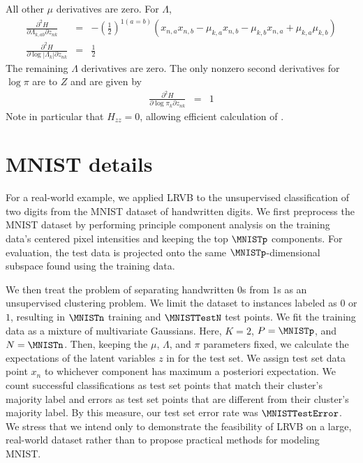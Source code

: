 %
All other $\mu$ derivatives are zero. For $\Lambda$,
%
\begin{eqnarray*}
\frac{\partial^{2}H}{\partial\Lambda_{k,ab}\partial z_{nk}} & = & -\left(\frac{1}{2}\right)^{1(a=b)}\left(x_{n,a}x_{n,b}-\mu_{k,a}x_{n,b}-\mu_{k,b}x_{n,a}+\mu_{k,a}\mu_{k,b}\right)\\
\frac{\partial^{2}H}{\partial\log\left|\Lambda_{k}\right|\partial z_{nk}} & = & \frac{1}{2}
\end{eqnarray*}
%
The remaining $\Lambda$ derivatives are zero. The only nonzero second
derivatives for $\log\pi$ are to $Z$ and are given by
%
\begin{eqnarray*}
\frac{\partial^{2}H}{\partial\log\pi_{k}\partial z_{nk}} & = & 1
\end{eqnarray*}
%
Note in particular that $H_{zz} = 0$, allowing efficient calculation of
.

\section{MNIST details} \label{app:mnist_details}

For a real-world example,
we applied LRVB to the unsupervised classification of two digits
from the MNIST dataset of handwritten digits.
We first preprocess the MNIST dataset by performing principle component
analysis on the training data's centered pixel intensities
and keeping the top $\MNISTp$ components.
For evaluation, the test data is projected onto the same
$\MNISTp$-dimensional subspace found using the training data.

We then treat the problem of
separating handwritten $0$s from $1$s as an unsupervised clustering
problem.  We limit the dataset to instances labeled as $0$
or $1$, resulting in $\MNISTn$ training and $\MNISTTestN$ test points.
We fit the training data
as a mixture of multivariate Gaussians.  Here, $K=2$, $P=\MNISTp$, and
$N=\MNISTn$.  Then, keeping the $\mu$, $\Lambda$, and $\pi$
parameters fixed, we calculate the expectations of the
latent variables $z$ in  for the test set.
We assign test set data point $x_n$ to whichever component has
maximum a posteriori expectation.  We count successful classifications
as test set points that match their cluster's majority label
and errors as test set points that are different from their cluster's
majority label.  By this measure, our test set error rate was
$\MNISTTestError$. We stress that we intend only to demonstrate
the feasibility of LRVB on a large, real-world dataset rather than
to propose practical methods for modeling MNIST.
